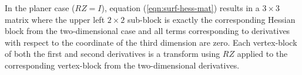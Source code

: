 \noindent In the planer case ($RZ = I$), equation (\ref{eqn:surf-hess-mat}) results in 
a $3 \times 3$  matrix where the upper left $2 \times 2$ sub-block is exactly the 
corresponding Hessian block from 
the two-dimensional case and all terms corresponding to derivatives with respect to the 
coordinate of the third dimension are zero.  Each vertex-block of both the first and second derivatives is a transform using $RZ$ applied to the corresponding vertex-block from the 
two-dimensional derivatives.



